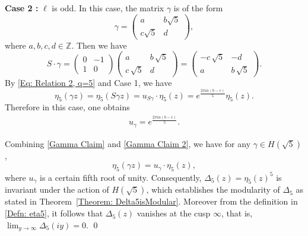 \documentclass[11pt]{amsart}
\numberwithin{equation}{section}
\theoremstyle{remark}
\begin{document}
\noindent \textbf{Case 2 :} $\ell$ is odd. In this case, the matrix $\gamma$ is of the form
\[
\gamma = \begin{pmatrix} a&b\sqrt{5}\\
c\sqrt{5}  & d\,\end{pmatrix},
\]
where $a,b,c,d \in \mathbb{Z}$. Then we have $$
S\cdot \gamma = \begin{pmatrix}   0&-1\\1&0
\end{pmatrix} \begin{pmatrix} a&b\,\sqrt{5}\\
c \,\sqrt{5} & d\end{pmatrix} = \begin{pmatrix} -c\,\sqrt{5}&-d\\
a  & b\,\sqrt{5}\end{pmatrix}.$$
By \eqref{Eq: Relation 2, q=5} and Case 1, we have
\[
\eta_5(\gamma z) = \eta_5(S\gamma z) = u_{S\gamma} \cdot \eta_5(z) =e^{\frac{2\pi i a(b-c)}{5}}  \eta_5(z).
\]
Therefore in this case, one obtains
\begin{align}\label{Gamma Claim 2}
u_{\gamma} = e^{\frac{2 \pi i a(b-c)}{5}}.
\end{align}
\par
Combining \eqref{Gamma Claim} and \eqref{Gamma Claim 2}, we have for any $\gamma \in H(\sqrt{5})$,
\[
\eta_5(\gamma z) = u_{\gamma} \cdot \eta_5(z), 
\]
where $u_{\gamma}$ is a certain fifth root of unity. Consequently, \( \Delta_5(z) = \eta_5(z)^5 \) is invariant under the action of \( H(\sqrt{5}) \), which establishes the modularity of \( \Delta_5 \) as stated in Theorem~\ref{Theorem: Delta5isModular}. Moreover from the definition in \eqref{Defn: eta5}, it follows that \( \Delta_5(z) \) vanishes at the cusp $\infty$, that is, $\lim_{y \to \infty} \Delta_5(iy) = 0.$ \qed
\end{document}
